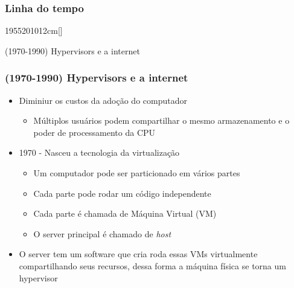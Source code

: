 \begin{frame}
	\frametitle{Linha do tempo}
	\begin{scriptsize}
	\begin{bf}
	\begin{center}
		\begin{chronology}[10]{1955}{2010}{12cm}[\textwidth]
			 
			\color{lightgreen}
		\end{chronology}
	\end{center}
	\end{bf}
	\end{scriptsize}
	\begin{center}
		(1970-1990) Hypervisors e a internet
	\end{center}
\end{frame}

\begin{frame}
	\frametitle{(1970-1990) Hypervisors e a internet}
	\begin{itemize}
		\item Diminiur os custos da adoção do computador
			\begin{itemize}
				\item Múltiplos usuários podem compartilhar o mesmo armazenamento e o poder de processamento da CPU
			\end{itemize}
		\item 1970 - Nasceu a tecnologia da virtualização
			\begin{itemize}
				\item Um computador pode ser particionado em vários partes
				\item Cada parte pode rodar um código independente
				\item Cada parte é chamada de Máquina Virtual (VM)
				\item O server principal é chamado de \it{host}
			\end{itemize}
		\item O server tem um software que cria roda essas VMs virtualmente compartilhando seus recursos, dessa forma a máquina física se torna um hypervisor
	\end{itemize}
\end{frame}

